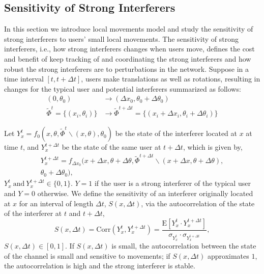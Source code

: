 \documentclass[10pt, conference, letterpaper]{IEEEtran}
\begin{document}
\subsection{Sensitivity of Strong Interferers}\label{section:channel:sensitivity}
In this section we introduce local movements model and study the sensitivity of strong interferers to users' small local movements.
The sensitivity of strong interferers, i.e., how strong interferers changes when users move, defines the cost and benefit of keep tracking of and coordinating the strong interferers and how robust the strong interferers are to perturbations in the network. Suppose in a time interval $[t, t+ \Delta t]$, users make translations as well as rotations, resulting in changes for the typical user and potential interferers summarized as follows:
\begin{equation*}
\begin{split}
(0,\theta_0)&\rightarrow(\Delta x_0, \theta_0 + \Delta\theta_0) \\
\tilde{\Phi}^{t}=\{(x_i, \theta_i)\}&\rightarrow\tilde{\Phi}^{t+\Delta t}=\{(x_i+\Delta x_i, \theta_i + \Delta\theta_i)\}
\end{split}
\end{equation*}

Let $Y_x^t=f_0(x, \theta, \tilde{\Phi}^t\backslash (x, \theta), \theta_0)$ be the state of the interferer located at $x$ at time $t$, and $Y_x^{t+\Delta t}$ be the state of the same user at $t+\Delta t$, which is given by,
\begin{multline*}
Y_{x}^{t+\Delta t} = f_{\Delta x_0}(x+\Delta x, \theta + \Delta\theta, \tilde{\Phi}^{t+\Delta t}\backslash (x+\Delta x, \theta + \Delta\theta), \\
\theta_0 + \Delta\theta_0),
\end{multline*}
$Y_x^t \mathrm{~and~} Y_{x}^{t+\Delta t} \in \{0,1\}$. $Y = 1$ if the user is a strong interferer of the typical user and $Y = 0$ otherwise. We define the sensitivity of an interferer originally located at $x$ for an interval of length $\Delta t$, $S(x, \Delta t)$, via the autocorrelation of the state of the interferer at $t$ and $t+\Delta t$, 
\begin{equation}
S(x, \Delta t)
=\mathrm{Corr}(Y_x^t, Y_x^{t+\Delta t})
=\frac{\mathrm{E}[Y_x^t\cdot Y_x^{t + \Delta t}]}{\sigma_{Y_x^t}\cdot \sigma_{Y_x^{t+\Delta t}}},
\end{equation}
$S(x, \Delta t)\in [0,1]$. If $S(x, \Delta t)$ is small, the autocorrelation between the state of the channel is small and sensitive to movements; if $S(x, \Delta t)$ approximates $1$, the autocorrelation is high and the strong interferer is stable.
\end{document}
